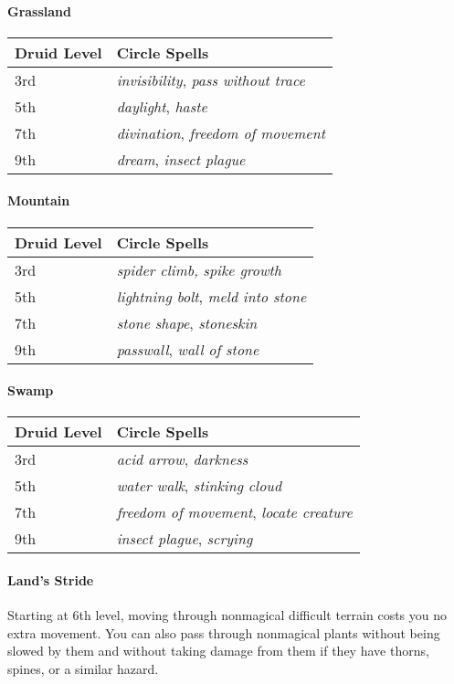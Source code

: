 \documentclass[
]{article}
\begin{document}
\hypertarget{grassland}{%
\paragraph{Grassland}\label{grassland}}

\begin{longtable}[]{@{}ll@{}}
\toprule
Druid Level & Circle Spells\tabularnewline
\midrule
\endhead
3rd & \emph{invisibility}, \emph{pass without trace}\tabularnewline
5th & \emph{daylight}, \emph{haste}\tabularnewline
7th & \emph{divination}, \emph{freedom of movement}\tabularnewline
9th & \emph{dream}, \emph{insect plague}\tabularnewline
\bottomrule
\end{longtable}

\hypertarget{mountain}{%
\paragraph{Mountain}\label{mountain}}

\begin{longtable}[]{@{}ll@{}}
\toprule
Druid Level & Circle Spells\tabularnewline
\midrule
\endhead
3rd & \emph{spider climb,} \emph{spike growth}\tabularnewline
5th & \emph{lightning bolt}, \emph{meld into stone}\tabularnewline
7th & \emph{stone shape}, \emph{stoneskin}\tabularnewline
9th & \emph{passwall}, \emph{wall of stone}\tabularnewline
\bottomrule
\end{longtable}

\hypertarget{swamp}{%
\paragraph{Swamp}\label{swamp}}

\begin{longtable}[]{@{}ll@{}}
\toprule
Druid Level & Circle Spells\tabularnewline
\midrule
\endhead
3rd & \emph{acid arrow}, \emph{darkness}\tabularnewline
5th & \emph{water walk}, \emph{stinking cloud}\tabularnewline
7th & \emph{freedom of movement}, \emph{locate creature}\tabularnewline
9th & \emph{insect plague}, \emph{scrying}\tabularnewline
\bottomrule
\end{longtable}

\hypertarget{lands-stride}{%
\paragraph{Land's Stride}\label{lands-stride}}

Starting at 6th level, moving through nonmagical difficult terrain costs
you no extra movement. You can also pass through nonmagical plants
without being slowed by them and without taking damage from them if they
have thorns, spines, or a similar hazard.
\end{document}
